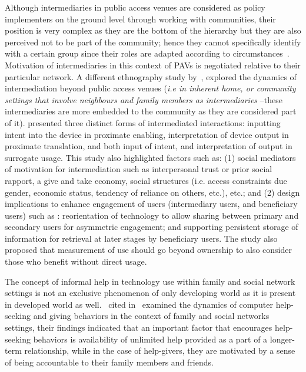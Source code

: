 Although intermediaries in public access venues are considered as policy implementers on the ground level through working with communities, their position is very complex as they are the bottom of the hierarchy but they are also perceived not to be part of the community; hence they cannot specifically identify with a certain group since their roles are adapted according to circumstances~\citep{bailur2010liminal}. Motivation of intermediaries in this context of PAVs is negotiated relative to their particular network. A different ethnography study by~\cite{sambasivan2010}, explored the dynamics of intermediation beyond public access venues (\emph{i.e in inherent home, or community settings that involve neighbours and family members as intermediaries} --these intermediaries are more embedded to the community as they are considered part of it). \cite{sambasivan2010} presented three distinct forms of intermediated interactions: inputting intent into the device in proximate enabling, interpretation of device output in proximate translation, and both input of intent, and interpretation of output in surrogate usage. This study also highlighted factors such as: (1) social mediators of motivation for intermediation such as interpersonal trust or prior social rapport, a give and take economy, social structures (i.e. access constraints due gender, economic status, tendency of reliance on others, etc.), etc.; and (2) design implications to enhance engagement of users (intermediary users, and beneficiary users) such as : reorientation of technology  to allow sharing between primary and secondary users for asymmetric engagement; and supporting persistent storage of information for retrieval at later stages by beneficiary users. The study also proposed that measurement of use should go beyond ownership to also consider those who benefit without direct usage. 

The concept of informal help in technology use within family and social network settings is not an exclusive phenomenon of only developing world as it is present in developed world as well.~\cite{poole:chh} cited in~\cite{katule2016leveraging} examined the dynamics of computer help-seeking and giving behaviors in the context of family and social networks settings, their findings indicated that an important factor that  encourages help-seeking behaviors is availability of unlimited help provided as a part of a longer-term relationship, while in the case of help-givers, they are motivated by a sense of being accountable to their family members and friends.

